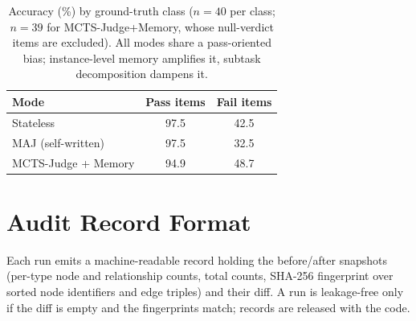 \documentclass[11pt]{article}
\begin{document}
\begin{table}[h]
\centering
\small
\begin{tabular}{lcc}
\toprule
Mode & Pass items & Fail items \\
\midrule
Stateless & 97.5 & 42.5 \\
MAJ (self-written) & 97.5 & 32.5 \\
MCTS-Judge + Memory & 94.9 & 48.7 \\
\bottomrule
\end{tabular}
\caption{Accuracy (\%) by ground-truth class ($n{=}40$ per class; $n{=}39$ for MCTS-Judge+Memory, whose null-verdict items are excluded). All modes share a pass-oriented bias; instance-level memory amplifies it, subtask decomposition dampens it.}
\label{tab:appclass}
\end{table}

\section{Audit Record Format}
Each run emits a machine-readable record holding the before/after snapshots (per-type node and relationship counts, total counts, SHA-256 fingerprint over sorted node identifiers and edge triples) and their diff. A run is leakage-free only if the diff is empty and the fingerprints match; records are released with the code.
\end{document}
